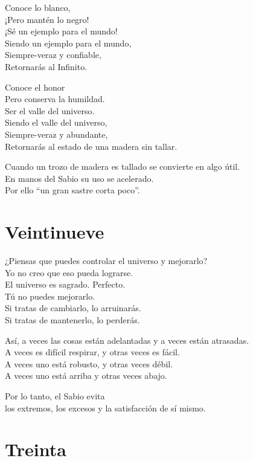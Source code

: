 \documentclass[hidelinks]{memoir}
\begin{document}
	Conoce lo blanco,\\
	¡Pero mantén lo negro!\\
	¡Sé un ejemplo para el mundo!\\
	Siendo un ejemplo para el mundo,\\
	Siempre-veraz y confiable,\\
	Retornarás al Infinito.
	
	Conoce el honor\\
	Pero conserva la humildad.\\
	Ser el valle del universo.\\
	Siendo el valle del universo,\\
	Siempre-veraz y abundante,\\
	Retornarás al estado de una madera sin tallar.
	
	Cuando un trozo de madera es tallado se convierte en algo útil.\\
	En manos del Sabio su uso se acelerado.\\
	Por ello ``un gran sastre corta poco''.
	
	\chapter*{Veintinueve}
	
	¿Piensas que puedes controlar el universo y mejorarlo?\\
	Yo no creo que eso pueda lograrse.\\
	El universo es sagrado. Perfecto.\\
	Tú no puedes mejorarlo.\\
	Si tratas de cambiarlo, lo arruinarás.\\
	Si tratas de mantenerlo, lo perderás.
	
	Así, a veces las cosas están adelantadas y a veces están atrasadas.\\
	A veces es difícil respirar, y otras veces es fácil.\\
	A veces uno está robusto, y otras veces débil.\\
	A veces uno está arriba y otras veces abajo.
	
	Por lo tanto, el Sabio evita\\
	los extremos, los excesos y la satisfacción de sí mismo.
	
	\chapter*{Treinta}
	
\end{document}
